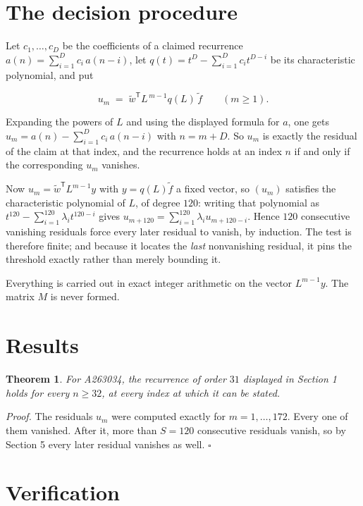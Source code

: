 \documentclass[11pt]{article}
\newtheorem{theorem}{Theorem}
\theoremstyle{definition}
\begin{document}
\section{The decision procedure}

Let $c_1,\dots,c_D$ be the coefficients of a claimed recurrence $a(n) = \sum_{i=1}^{D} c_i\,a(n-i)$, let $q(t) = t^{D} - \sum_{i=1}^{D} c_i t^{D-i}$ be its characteristic polynomial, and put

\[u_m \;=\; \tilde w^{\mathsf T} L^{\,m-1} q(L)\,\tilde f \qquad (m \ge 1).\]

Expanding the powers of $L$ and using the displayed formula for $a$, one gets $u_m = a(n) - \sum_{i=1}^{D} c_i\,a(n-i)$ with $n = m + D$. So $u_m$ is exactly the residual of the claim at that index, and the recurrence holds at an index $n$ if and only if the corresponding $u_m$ vanishes.

Now $u_m = \tilde w^{\mathsf T} L^{m-1} y$ with $y = q(L)\tilde f$ a fixed vector, so $(u_m)$ satisfies the characteristic polynomial of $L$, of degree $120$: writing that polynomial as $t^{120} - \sum_{i=1}^{120} \lambda_i t^{120-i}$ gives $u_{m+120} = \sum_{i=1}^{120} \lambda_i u_{m+120-i}$. Hence $120$ consecutive vanishing residuals force every later residual to vanish, by induction. The test is therefore finite; and because it locates the {\itshape last} nonvanishing residual, it pins the threshold exactly rather than merely bounding it.

Everything is carried out in exact integer arithmetic on the vector $L^{m-1}y$. The matrix $M$ is never formed.

\section{Results}

\begin{theorem} For A263034, the recurrence of order $31$ displayed in Section 1 holds for every $n \ge 32$, at every index at which it can be stated.\end{theorem}

{\itshape Proof.} The residuals $u_m$ were computed exactly for $m = 1,\dots,172$. Every one of them vanished. After it, more than $S = 120$ consecutive residuals vanish, so by Section 5 every later residual vanishes as well. $\square$

\section{Verification}
\end{document}
